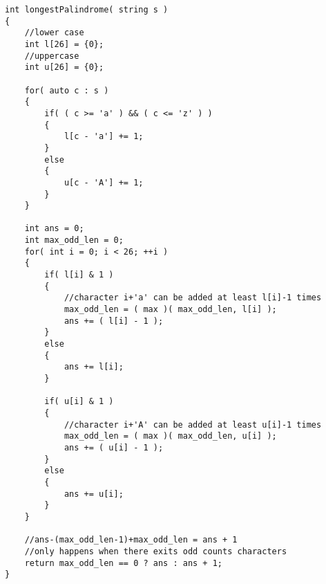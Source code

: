 \setcounter{lstlisting}{0}
\begin{lstlisting}[style=customc, caption={Counting}]
int longestPalindrome( string s )
{
    //lower case
    int l[26] = {0};
    //uppercase
    int u[26] = {0};

    for( auto c : s )
    {
        if( ( c >= 'a' ) && ( c <= 'z' ) )
        {
            l[c - 'a'] += 1;
        }
        else
        {
            u[c - 'A'] += 1;
        }
    }

    int ans = 0;
    int max_odd_len = 0;
    for( int i = 0; i < 26; ++i )
    {
        if( l[i] & 1 )
        {
            //character i+'a' can be added at least l[i]-1 times
            max_odd_len = ( max )( max_odd_len, l[i] );
            ans += ( l[i] - 1 );
        }
        else
        {
            ans += l[i];
        }

        if( u[i] & 1 )
        {
            //character i+'A' can be added at least u[i]-1 times
            max_odd_len = ( max )( max_odd_len, u[i] );
            ans += ( u[i] - 1 );
        }
        else
        {
            ans += u[i];
        }
    }

    //ans-(max_odd_len-1)+max_odd_len = ans + 1
    //only happens when there exits odd counts characters
    return max_odd_len == 0 ? ans : ans + 1;
}
\end{lstlisting}
